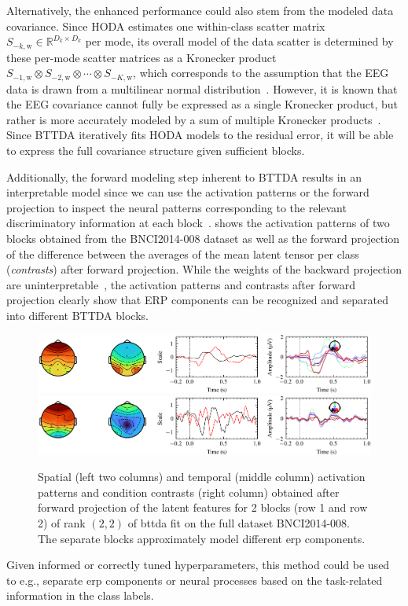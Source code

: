 \documentclass[10pt]{iopart}
\begin{document}
Alternatively, the enhanced performance could also stem from the modeled data
covariance.
Since HODA estimates one within-class scatter matrix
$S_{-k,\text{w}}\in\mathbb{R}^{D_k\times D_k}$ per mode, its overall
model of the data scatter is determined by these per-mode scatter matrices as a
Kronecker product $S_{-1,\text{w}}\otimes S_{-2,\text{w}}\otimes\cdots\otimes S_{-K,\text{w}}$, which corresponds to the assumption that the EEG data is
drawn from a multilinear normal distribution~\cite{Ohlson2013}.
However, it is known that the EEG covariance cannot fully be expressed as a
single Kronecker product, but rather is more accurately modeled by a sum of
multiple Kronecker products~\cite{Bijma2005, Sosulski2022}.
Since BTTDA iteratively fits HODA models to the residual error, it will be able
to express the full covariance structure given sufficient blocks.

Additionally, the forward modeling step inherent to BTTDA results
in an interpretable model since we can use the activation patterns or the
forward projection to inspect the neural patterns corresponding to the
relevant discriminatory information at each block~\cite{Haufe2014}.
 shows the activation patterns
of two blocks obtained from the BNCI2014-008 dataset as well as the forward
projection of the difference between the averages of the mean latent tensor per
class (\emph{contrasts}) after forward projection.
While the weights of the backward projection are
uninterpretable~\cite{Haufe2014},
the activation patterns and contrasts after forward projection clearly show
that ERP components can be recognized and separated into different
BTTDA blocks.
\begin{figure}[t]
	\includegraphics[width=\linewidth]{figures/forward_block-0.png}
	\includegraphics[width=\linewidth]{figures/forward_block-1.png}
  \caption[Extracted \acs{bttda} activation patterns.]{%
    Spatial (left two columns) and temporal (middle column) activation patterns and
		condition contrasts (right column) obtained after forward projection of the latent
    features for 2 blocks (row 1 and row 2) of rank $(2,2)$ of \ac{bttda}
    fit on the full dataset BNCI2014-008.
    The separate blocks approximately model different \ac{erp}
		components.}
	\label{fig:forward}
\end{figure}
Given informed or correctly tuned hyperparameters, this method could be used to
e.g., separate \ac{erp} components or neural processes based on the task-related
information in the class labels.
\end{document}
